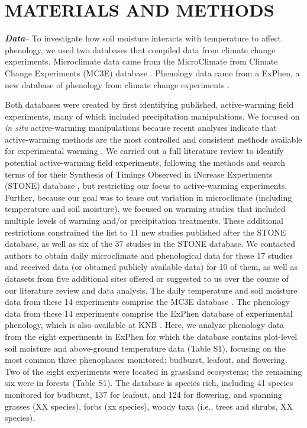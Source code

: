 \documentclass{article}
\begin{document}
\section* {MATERIALS AND METHODS}
\textbf {\emph{Data}}-- To investigate how soil moisture interacts with temperature to affect phenology, we used two databases that compiled data from climate change experiments. Microclimate data came from the  MicroClimate from Climate Change Experiments (MC3E) database \citep{ettinger2018, ettinger2019}. Phenology data came from a ExPhen, a new database of phenology from climate change experiments \citep{ettinger2022}. 
\par Both databases were created by first identifying published, active-warming field experiments, many of which included precipitation manipulations. We focused on \textit{in situ} active-warming manipulations because recent analyses indicate that active-warming methods are the most controlled and consistent methods available for experimental warming \citep{kimball2005,kimball2008,aronson2009,wolkovich2012}. We carried out a full literature review to identify potential active-warming field experiments, following the methods and search terms of \citet{wolkovich2012} for their Synthesis of Timings Observed in iNcrease Experiments (STONE) database \citep{wolkovich2012}, but restricting our focus to active-warming experiments. Further, because our goal was to tease out variation in microclimate (including temperature and soil moisture), we focused on warming studies that included multiple levels of warming and/or precipitation treatments. These additional restrictions constrained the list to 11 new studies published after the STONE database, as well as six of the 37 studies in the STONE database. We contacted authors to obtain daily microclimate and phenological data for these 17 studies and received data (or obtained publicly available data) for 10 of them, as well as datasets from five additional sites offered or suggested to us over the course of our literature review and data analysis. The daily temperature and soil moisture data from these 14 experiments comprise the MC3E database \citep{ettinger2018,ettinger2019}. The phenology data from these 14 experiments comprise the ExPhen database of experimental phenology, which is also available at KNB \citep{ettinger2022}. Here, we analyze phenology data from the eight experiments in ExPhen for which the database contains plot-level soil moisture and above-ground temperature data (Table S1), focusing on the most common three phenophases monitored: budburst, leafout, and flowering. Two of the eight experiments were located in grassland ecosystems; the remaining six were in forests (Table S1). The database is species rich, including 41 species monitored for budburst, 137 for leafout, and 124 for flowering, and spanning grasses (XX species), forbs (xx species), woody taxa (i.e., trees and shrubs, XX species).  
\end{document}
